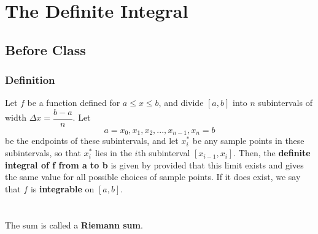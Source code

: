 \documentclass[notes]{subfiles}
\begin{document}
	\fancyhead[LO,RE]{\bfseries \currentname}
	\fancyfoot[C]{{}}
	\fancyfoot[RO,LE]{\large \thepage}	%
	
\section*{The Definite Integral} \label{cs42}
	\subsection*{Before Class}
	\subsubsection*{Definition}
		\begin{defn}
			Let $f$ be a function defined for $a\leq x\leq b$, and divide $[a,b]$ into $n$ subintervals of width $\Delta x = \dfrac{b-a}{n}$.  Let 
				\[a=x_0,x_1,x_2,...,x_{n-1},x_n=b\]
			be the endpoints of these subintervals, and let $x_i^*$ be any sample points in these subintervals, so that $x_i^*$ lies in the $i$th subinterval $[x_{i-1},x_i]$.  Then, the \textbf{definite integral of f from a to b} is given by
			provided that this limit exists and gives the same value for all possible choices of sample points.  If it does exist, we say that $f$ is \textbf{integrable} on $[a,b]$.\\ \\ \\
			
			The sum 
			is called a \textbf{Riemann sum}.  		
		\end{defn}
		
\end{document}
